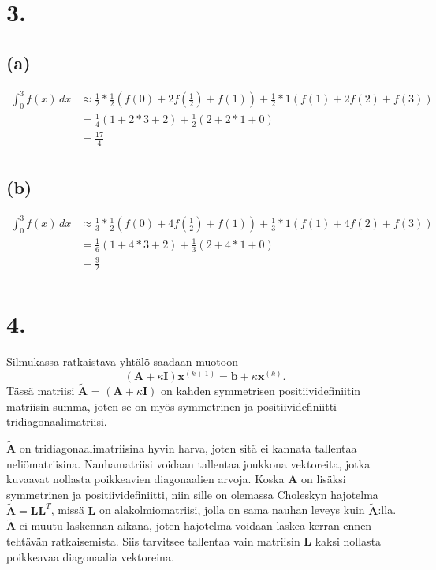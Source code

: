 \documentclass{article}
\begin{document}
\section*{3.}

\subsection*{(a)}

\begin{align*}
  \int_0^3 f(x)\,dx &\approx \frac{1}{2}*\frac{1}{2}(f(0) + 2f(\frac{1}{2}) + f(1))
    + \frac{1}{2}*1(f(1) + 2f(2) + f(3)) \\
                    &= \frac{1}{4}(1 + 2*3 + 2) + \frac{1}{2}(2 + 2*1 + 0) \\
                    &= \frac{17}{4} \\
\end{align*}

\subsection*{(b)}

\begin{align*}
  \int_0^3 f(x)\,dx &\approx \frac{1}{3}*\frac{1}{2}(f(0) + 4f(\frac{1}{2}) + f(1))
  + \frac{1}{3}*1(f(1) + 4f(2) + f(3)) \\
                    &= \frac{1}{6}(1 + 4*3 + 2) + \frac{1}{3}(2 + 4*1 + 0) \\
                    &= \frac{9}{2} \\
\end{align*}


\section*{4.}

Silmukassa ratkaistava yhtälö saadaan muotoon
\[
  (\mathbf{A} + \kappa \mathbf{I})\mathbf{x}^{(k+1)} = \mathbf{b} + \kappa\mathbf{x}^{(k)}.
\]
Tässä matriisi $\tilde{\mathbf{A}}$ = $(\mathbf{A} + \kappa \mathbf{I})$ on
kahden symmetrisen positiividefiniitin matriisin summa, joten se on myös
symmetrinen ja positiividefiniitti tridiagonaalimatriisi.

$\tilde{\mathbf{A}}$ on tridiagonaalimatriisina hyvin harva, joten sitä ei kannata
tallentaa neliömatriisina. Nauhamatriisi voidaan tallentaa joukkona vektoreita,
jotka kuvaavat nollasta poikkeavien diagonaalien arvoja. Koska $\mathbf{A}$ on
lisäksi symmetrinen ja positiividefiniitti, niin sille on olemassa Choleskyn hajotelma
$\tilde{\mathbf{A}} = \mathbf{LL}^T$, missä $\mathbf{L}$ on alakolmiomatriisi,
jolla on sama nauhan leveys kuin $\tilde{\mathbf{A}}$:lla.
$\tilde{\mathbf{A}}$ ei muutu laskennan aikana,
joten hajotelma voidaan laskea kerran ennen tehtävän ratkaisemista.
Siis tarvitsee tallentaa vain
matriisin $\mathbf{L}$ kaksi nollasta poikkeavaa diagonaalia vektoreina.
\end{document}
